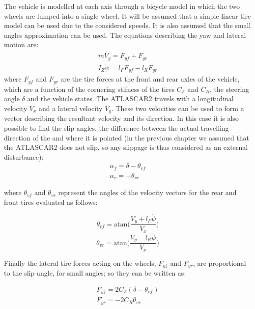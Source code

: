 The vehicle is modelled at each axis through a bicycle model in which the two wheels are lumped into a single wheel. It will be assumed that a simple linear tire model can be used due to the considered speeds. It is also assumed that the small angles approximation can be used.
The equations describing the yaw and lateral motion are:
\begin{equation}
	\label{eqn:yaw_lateral_motion}
	\begin{array}{ll}
	m\dot{V_y}=F_{yf}+F_{yr}\\
	I_Z\ddot{\psi}=l_FF_{yf}-l_RF_{yr}
	\end{array}
\end{equation}
where $F_{yf}$ and $F_{yr}$ are the tire forces at the front and rear axles of the vehicle, which are a function of the cornering stifness of the tires $C_F$ and $C_R$, the steering angle $\delta$ and the vehicle states.
The ATLASCAR2 travels with a longitudinal velocity $V_x$ and a lateral velocity $V_y$. These two velocities can be used to form a vector describing the resultant velocity and its direction. In this case it is also possible to find the slip angles, the difference between the actual travelling direction of the and where it is pointed (in the previous chapter we assumed that the ATLASCAR2 does not slip, so any slippage is thus considered as an external disturbance):
\begin{equation}
	\label{eqn:alpha_f_alpha_r}
	\begin{array}{ll}
	\alpha_f = \delta-\theta_{vf}\\
	\alpha_r = -\theta_{vr}
	\end{array}
\end{equation}

where $\theta_{vf}$ and $\theta_{vr}$ represent the angles of the velocity vectors for the rear and front tires evaluated as follows:

\begin{equation}
\label{eqn:theta_vf}
\theta_{vf}=\text{atan}\Bigg(\frac{V_y+l_F\dot{\psi}}{V_x}\Bigg)
\end{equation}
\begin{equation}
\label{eqn:theta_vr}
\theta_{vr}=\text{atan}\Bigg(\frac{V_y-l_R\dot{\psi}}{V_x}\Bigg)
\end{equation}

Finally the lateral tire forces acting on the wheels, $F_{yf}$ and $F_{yr}$, are proportional to the slip angle, for small angles; so they can be written as:

\begin{equation}
	\label{eqn:lateral_tire_forces}
	\begin{array}{ll}
	F_{yf} = 2C_F(\delta-\theta_{vf})\\
	F_{yr} = -2C_R\theta_{vr}
	\end{array}
\end{equation} 

